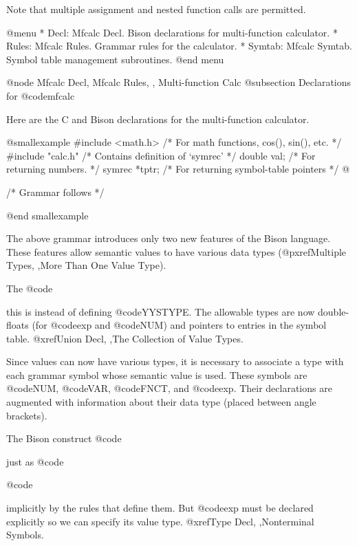 {{{{{{{{{{Note that multiple assignment and nested function calls are permitted.

@menu
* Decl: Mfcalc Decl.      Bison declarations for multi-function calculator.
* Rules: Mfcalc Rules.    Grammar rules for the calculator.
* Symtab: Mfcalc Symtab.  Symbol table management subroutines.
@end menu

@node Mfcalc Decl, Mfcalc Rules,  , Multi-function Calc
@subsection Declarations for @code{mfcalc}

Here are the C and Bison declarations for the multi-function calculator.

@smallexample
#include <math.h>  /* For math functions, cos(), sin(), etc. */
#include "calc.h"  /* Contains definition of `symrec'        */
double     val;  /* For returning numbers.                   */
symrec  *tptr;   /* For returning symbol-table pointers      */
@}



/* Grammar follows */

@end smallexample

The above grammar introduces only two new features of the Bison language.
These features allow semantic values to have various data types
(@pxref{Multiple Types, ,More Than One Value Type}).

The @code{%
this is instead of defining @code{YYSTYPE}.  The allowable types are now
double-floats (for @code{exp} and @code{NUM}) and pointers to entries in
the symbol table.  @xref{Union Decl, ,The Collection of Value Types}.

Since values can now have various types, it is necessary to associate a
type with each grammar symbol whose semantic value is used.  These symbols
are @code{NUM}, @code{VAR}, @code{FNCT}, and @code{exp}.  Their
declarations are augmented with information about their data type (placed
between angle brackets).

The Bison construct @code{%
just as @code{%
@code{%
implicitly by the rules that define them.  But @code{exp} must be declared
explicitly so we can specify its value type.  @xref{Type Decl, ,Nonterminal Symbols}.

}}}}}}}}}}}}}
